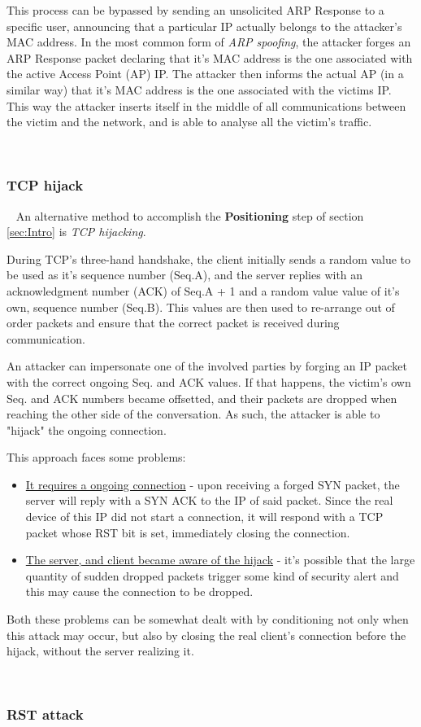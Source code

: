 This process can be bypassed by sending an unsolicited ARP Response to a 
specific user, announcing that a particular IP actually belongs to the 
attacker's MAC address.
In the most common form of \textit{ARP spoofing}, the attacker forges an ARP 
Response packet declaring that it's MAC address is the one associated with the
active Access Point (AP) IP. 
The attacker then informs the actual AP (in a similar way) that it's MAC address
is the one associated with the victims IP.
This way the attacker inserts itself in the middle of all communications 
between the victim and the network, and is able to analyse all the victim's 
traffic.

~
\subsubsection{TCP hijack}

~\newline
An alternative method to accomplish the \textbf{Positioning} step of section
\ref{sec:Intro} is \textit{TCP hijacking}. 

During TCP's three-hand handshake, the client initially sends a random value to
be used as it's sequence number (Seq.A), and the server replies with an 
acknowledgment number (ACK) of Seq.A + 1 and a random value value of it's own, 
sequence number (Seq.B).
This values are then used to re-arrange out of order packets and ensure that 
the correct packet is received during communication.

An attacker can impersonate one of the involved parties by forging an IP packet 
with the correct ongoing Seq. and ACK values. 
If that happens, the victim's own Seq. and ACK numbers became offsetted, and 
their packets are dropped when reaching the other side of the conversation.
As such, the attacker is able to "hijack" the ongoing connection.

This approach faces some problems: 
\begin{itemize}
    \item \underline{It requires a ongoing connection} - upon receiving a forged
        SYN packet, the server will reply with a SYN ACK to the IP of said 
        packet. 
        Since the real device of this IP did not start a connection, it will
        respond with a TCP packet whose RST bit is set, immediately closing the
        connection.

    \item \underline{The server, and client became aware of the 
        hijack} - it's possible that the large quantity of sudden dropped 
        packets trigger some kind of security alert and this may cause the 
        connection to be dropped.
\end{itemize}

Both these problems can be somewhat dealt with by conditioning not only 
when this attack may occur, but also by closing the real client's connection 
before the hijack, without the server realizing it.

~
\subsubsection{RST attack}
~\newline

